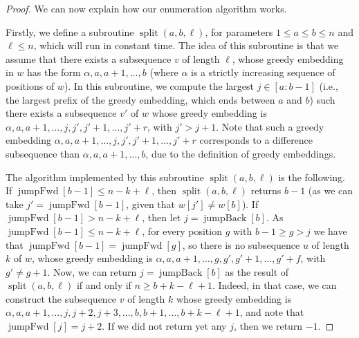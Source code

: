 \documentclass[runningheads,UKenglish,cleveref, autoref, thm-restate]{llncs}
\DeclareMathOperator{\splitt}{split}
\DeclareMathOperator{\jumpAhead}{{jumpFwd}}
\DeclareMathOperator{\jumpBack}{{jumpBack}}
\begin{document}
\begin{proof}
We can now explain how our enumeration algorithm works.  

Firstly, we define a subroutine $\splitt(a,b,\ell)$, for parameters $1\leq a\leq b\leq n$ and $\ell\leq n$, which will run in constant time. The idea of this subroutine is that we assume that there exists a subsequence $v$ of length $\ell$, whose greedy embedding in $w$ has the form $\alpha, a,a+1,\ldots,b$ (where $\alpha$ is a strictly increasing sequence of positions of $w$). In this subroutine, we compute the largest $j\in [a:b-1]$ (i.e., the largest prefix of the greedy embedding, which ends between $a$ and $b$) such there exists a subsequence $v'$ of $w$ whose greedy embedding is $\alpha, a, a+1, \ldots, j, j', j'+1, \ldots, j'+r$, with $j'> j+1$. Note that such a greedy embedding  $\alpha, a, a+1, \ldots, j, j', j'+1, \ldots, j'+r$ corresponds to a difference subsequence than $\alpha, a,a+1,\ldots,b$, due to the definition of greedy embeddings. 

The algorithm implemented by this subroutine $\splitt(a,b,\ell)$ is the following. If $\jumpAhead[b-1]\leq n- k+\ell$, then $\splitt(a,b,\ell)$ returns $b-1$ (as we can take $j'=\jumpAhead[b-1]$, given that $w[j']\neq w[b]$).  If $\jumpAhead[b-1]> n- k+\ell$, then let $j=\jumpBack[b]$. As  $\jumpAhead[b-1]\leq n- k+\ell$, for every position $g$ with $b-1\geq g>j$ we have that $\jumpAhead[b-1]=\jumpAhead[g]$, so there is no subsequence $u$ of length $k$ of $w$, whose greedy embedding is $\alpha, a, a+1, \ldots, g, g', g'+1, \ldots, g'+f$, with $g'\neq g+1$. Now, we can return $j=\jumpBack[b]$ as the result of $\splitt(a,b,\ell)$ if and only if $n\geq b+k-\ell+1$. Indeed, in that case, we can construct the subsequence $v$ of length $k$ whose greedy embedding is $\alpha, a, a+1, \ldots, j, j+2, j+3, \ldots,  b, b+1, \ldots, b+k-\ell+1 $, and note that $\jumpAhead[j]=j+2$. If we did not return yet any $j$, then we return $-1$.


\end{proof}
\end{document}
